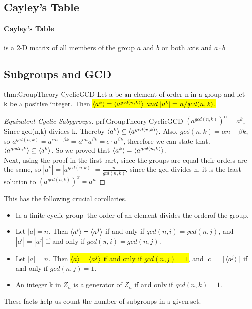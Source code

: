 \subsection{Cayley's Table}

\paragraph{Cayley's Table} is a 2-D matrix of all members of the group $a$ and $b$ on both axis and $a \cdot b$

\subsection{Subgroups and GCD}

\begin{theorem}{thm:GroupTheory-CyclicGCD}
    Let a be an element of order n in a group and let k be a positive integer. Then 
    \colorbox{yellow}{$ \braket{a^k} = \braket{a^{gcd(n,k)}}\;and\;|a^k| = n/gcd(n, k). $}    
\end{theorem}

\begin{proof}[Equivalent Cyclic Subpgroups]{prf:GroupTheory-CyclicGCD}
    $(a^{gcd(n,k)})^{\alpha} = a^k$, Since gcd(n,k) divides k. Thereby $ \braket{a^{k}} \subseteq \braket{a^{gcd(n,k)}}$.
    Also, $gcd(n,k) = \alpha n + \beta k$, so $a^{gcd(n,k)} = a^{\alpha n + \beta k} = a^{\alpha n} a^{\beta k} = e \cdot a^{\beta k}$, therefore we can state that, $\braket{a^{gcd{n,k}}} \subseteq \braket{a^k}$. So we proved that $\braket{a^k} = \braket{a^{gcd(n,k)}}$.
    \vspace{10pt} \\ Next, using the proof in the first part, since the groups are equal their orders are the same, so
    $|a^{k}| = |a^{gcd(n,k)}| = \frac{n}{gcd(n,k)}$, since the gcd divides n, it is the least solution to $(a^{gcd(n,k)})^x = a^n$
\end{proof}

This has the following crucial corollaries.
\begin{itemize}
    \item In a finite cyclic group, the order of an element divides the orderof the group.
    \item Let $|a| = n$. Then $\braket{a^i} = \braket{a^j}$ if and only if $gcd(n, i) = gcd(n, j)$, and $|a^i| = |a^j|$ if and only if $gcd(n, i) = gcd(n, j)$.
    \item Let $|a| = n$. Then \colorbox{yellow}{$\braket{a} = \braket{a^j}$ if and only if $gcd(n, j) = 1$}, and $|a| = |\braket{a^j}|$ if and only if $gcd(n, j) = 1$.
    \item An integer k in $Z_n$ is a generator of $Z_n$ if and only if $gcd(n, k) = 1$.
\end{itemize}
These facts help us count the number of subgroups in a given set.


